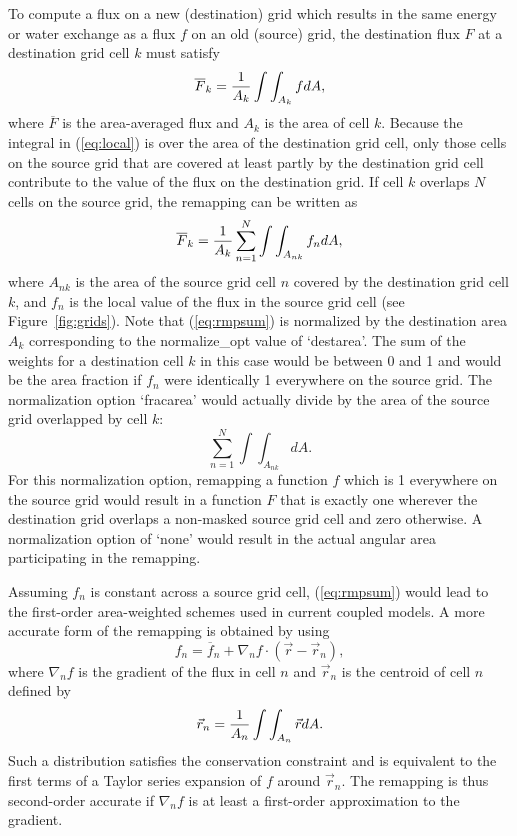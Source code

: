 \documentclass[12pt]{report}
\begin{document}
To compute a flux on a new (destination) grid which
results in the same energy or water exchange as a flux $f$ on an
old (source) grid, the destination flux $F$ at a destination grid
cell $k$ must satisfy
\begin{equation}\label{eq:local}
\overline{F}_k = {1\over{A_k}}\int\int_{A_k} fdA,
\end{equation}
where $\overline{F}$ is the area-averaged flux and $A_k$ is
the area of cell $k$.
Because the integral in (\ref{eq:local}) is over the area of
the destination grid cell, only those cells on the source grid
that are covered at least partly by the destination grid cell
contribute to the value of the flux on the destination grid.
If cell $k$ overlaps $N$ cells on the source grid, the
remapping can be written as
\begin{equation}\label{eq:rmpsum}
\overline{F}_k =
{1\over{A_k}} \sum_{n=1}^N \int\int_{A_{nk}} f_ndA,
\end{equation}
where $A_{nk}$ is the
area of the source grid cell $n$ covered by the destination grid
cell $k$, and $f_n$ is the local value of the flux in the source
grid cell (see Figure~\ref{fig:grids}).  Note that (\ref{eq:rmpsum})
is normalized by the destination area $A_k$ corresponding to
the normalize\_opt value of `destarea'.  The sum of the weights
for a destination cell $k$ in this case would be between 0 and 1
and would be the area fraction if $f_n$ were identically 1
everywhere on the source grid.  The normalization option
`fracarea' would actually divide by the area of the source
grid overlapped by cell $k$:
\begin{equation}
\sum_{n=1}^N \int\int_{A_{nk}}dA.
\end{equation}
For this normalization option, remapping a function $f$ which
is 1 everywhere on the source grid would result in a function
$F$ that is exactly one wherever the destination grid overlaps
a non-masked source grid cell and zero otherwise.  A normalization
option of `none' would result in the actual angular area
participating in the remapping.

Assuming $f_n$ is constant across a source grid cell,
(\ref{eq:rmpsum})
would lead to the first-order area-weighted schemes used in
current coupled models.  A more accurate form of the remapping
is obtained by using
\begin{equation}\label{eq:gradient}
f_n = \overline{f}_n +
                   \nabla_n f\cdot({\vec{r}} - \vec{r}_n),
\end{equation}
where $\nabla_n f$ is the gradient of the flux in cell $n$ and
$\vec{r}_n$ is the centroid of cell $n$ defined by
\begin{equation}\label{eq:centroid}
\vec{r}_n = {1\over{A_n}}\int\int_{A_n}\vec{r}dA.
\end{equation}
Such a distribution satisfies the conservation constraint and
is equivalent to the first terms of a Taylor series expansion
of $f$ around $\vec{r}_n$.  The remapping is thus
second-order accurate if $\nabla_n f$ is at least a
first-order approximation to the gradient.
\end{document}
